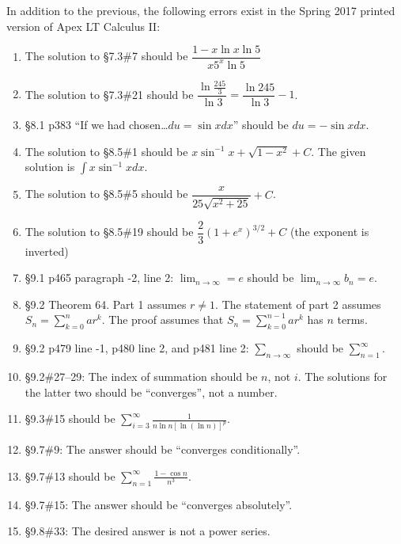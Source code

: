 \documentclass{amsart}
\newcommand{\ds}{\displaystyle}
\begin{document}

\springerrors

In addition to the previous, the following errors exist in the Spring 2017 printed version of Apex LT Calculus II:
\begin{enumerate}
\item The solution to \S7.3\#7 should be $\dfrac{1-x\ln x\ln5}{x5^x\ln5}$\smallskip
\item The solution to \S7.3\#21 should be $\dfrac{\ln\frac{245}3}{\ln3}=\dfrac{\ln245}{\ln3}-1$.
\item \S8.1 p383 ``If we had chosen\ldots $du=\sin x dx$'' should be $du=-\sin x dx$.
\item The solution to \S8.5\#1 should be $x\sin^{-1}x+\sqrt{1-x^2}+C$.  The given solution is $\ds\int x\sin^{-1}x dx$.\vspace{-.3\baselineskip}
\item The solution to \S8.5\#5 should be $\dfrac x{25\sqrt{x^2+25}}+C$.
\item The solution to \S8.5\#19 should be $\dfrac23 (1+e^x)^{3/2}+C$ (the exponent is inverted)
\item \S9.1 p465 paragraph -2, line 2: $\ds \lim_{n\to \infty}=e$ should be $\ds \lim_{n\to \infty}b_n=e$.
\vspace{-.5\baselineskip}
\item \S9.2 Theorem 64.  Part 1 assumes $r\neq1$.  The statement of part 2 assumes $S_n=\ds\sum_{k=0}^n ar^k$.\vspace{-\baselineskip} The proof assumes that $S_n=\ds\sum_{k=0}^{n-1} ar^k$ has $n$ terms.\vspace{-.7\baselineskip}
\item \S9.2 p479 line -1, p480 line 2, and p481 line 2: $\ds\sum_{n\to\infty}$ should be $\ds\sum_{n=1}^\infty$.
\item \S9.2\#27--29: The index of summation should be $n$, not $i$.  The solutions for the latter two should be ``converges'', not a number.\vspace{-.3\baselineskip}
\item \S9.3\#15 should be $\ds\sum_{i=3}^\infty\frac1{n\ln n[\ln(\ln n)]^p}$.
\item \S9.7\#9: The answer should be ``converges conditionally''.
\item \S9.7\#13 should be $\ds \sum_{n=1}^\infty \frac{1-\cos n}{n^3}$.
\item \S9.7\#15: The answer should be ``converges absolutely''.
\item \S9.8\#33: The desired answer is not a power series.

\end{enumerate}
\end{document}
